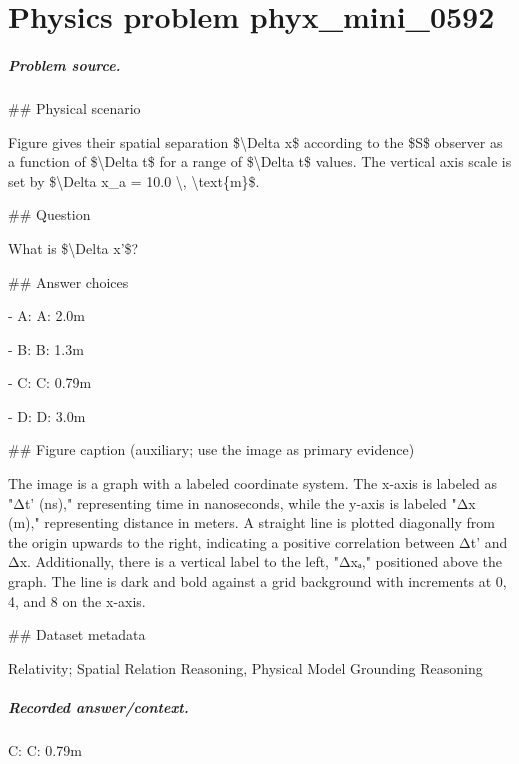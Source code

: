 
\chapter{Physics problem phyx\_mini\_0592}
\label{ch:PhyXMiniProblems_problem_phyx_mini_0592}

\paragraph{Problem source.}
\#\# Physical scenario

Figure gives their spatial separation \$\textbackslash{}Delta x\$ according to the \$S\$ observer as a function of \$\textbackslash{}Delta t\$ for a range of \$\textbackslash{}Delta t\$ values. The vertical axis scale is set by \$\textbackslash{}Delta x\_a = 10.0 \textbackslash{}, \textbackslash{}text\{m\}\$.

\#\# Question

What is \$\textbackslash{}Delta x'\$?

\#\# Answer choices

- A: A: 2.0m

- B: B: 1.3m

- C: C: 0.79m

- D: D: 3.0m

\#\# Figure caption (auxiliary; use the image as primary evidence)

The image is a graph with a labeled coordinate system. The x-axis is labeled as "Δt' (ns)," representing time in nanoseconds, while the y-axis is labeled "Δx (m)," representing distance in meters. A straight line is plotted diagonally from the origin upwards to the right, indicating a positive correlation between Δt' and Δx. Additionally, there is a vertical label to the left, "Δxₐ," positioned above the graph. The line is dark and bold against a grid background with increments at 0, 4, and 8 on the x-axis.

\#\# Dataset metadata

Relativity; Spatial Relation Reasoning, Physical Model Grounding Reasoning

\paragraph{Recorded answer/context.}
C: C: 0.79m

